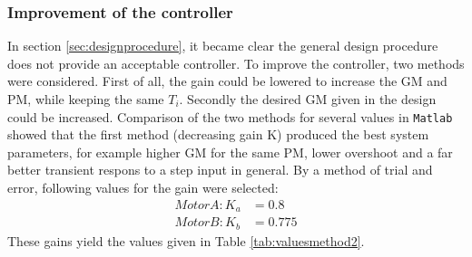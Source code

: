 \documentclass[a4paper,kul]{kulakarticle} %
\begin{document}
\newpage
\subsubsection{Improvement of the controller}
In section \ref{sec:designprocedure}, it became clear the general design procedure does not provide an acceptable controller. To improve the controller, two methods were considered. First of all, the gain could be lowered to increase the GM and PM, while keeping the same $T_i$. Secondly the desired GM given in the design could be increased. Comparison of the two methods for several values in \texttt{Matlab} showed that the first method (decreasing gain K) produced the best system parameters, for example higher GM for the same PM, lower overshoot and a far better transient respons to a step input in general. By a method of trial and error, following values for the gain were selected: 
\begin{equation}
	\begin{split}
	Motor A: K_a &= 0.8\\
	Motor B: K_b &= 0.775
	\end{split}
\end{equation}
These gains yield the values given in Table \ref{tab:valuesmethod2}. 
\end{document}
